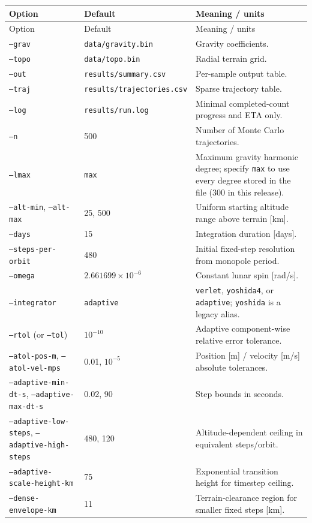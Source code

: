 \documentclass[11pt,a4paper]{article}
\newcommand{\opt}[1]{\texttt{#1}}
\newcommand{\pathcode}[1]{\nolinkurl{#1}}
\begin{document}
{\footnotesize\renewcommand{\arraystretch}{1.11}
\begin{longtable}{@{}p{.32\linewidth}p{.22\linewidth}p{.40\linewidth}@{}}
\toprule Option & Default & Meaning / units\\ \midrule\endfirsthead
\toprule Option & Default & Meaning / units\\ \midrule\endhead
\opt{--grav} & \pathcode{data/gravity.bin} & Gravity coefficients.\\
\opt{--topo} & \pathcode{data/topo.bin} & Radial terrain grid.\\
\opt{--out} & \pathcode{results/summary.csv} & Per-sample output table.\\
\opt{--traj} & \pathcode{results/trajectories.csv} & Sparse trajectory table.\\
\opt{--log} & \pathcode{results/run.log} & Minimal completed-count progress and ETA only.\\
\opt{--n} & 500 & Number of Monte Carlo trajectories.\\
\opt{--lmax} & \opt{max} & Maximum gravity harmonic degree; specify \opt{max} to use every degree stored in the file (300 in this release).\\
\opt{--alt-min}, \opt{--alt-max} & 25, 500 & Uniform starting altitude range above terrain [km].\\
\opt{--days} & 15 & Integration duration [days].\\
\opt{--steps-per-orbit} & 480 & Initial fixed-step resolution from monopole period.\\
\opt{--omega} & \(2.661699\times10^{-6}\) & Constant lunar spin [rad/s].\\
\opt{--integrator} & \opt{adaptive} & \opt{verlet}, \opt{yoshida4}, or \opt{adaptive}; \opt{yoshida} is a legacy alias.\\
\opt{--rtol} (or \opt{--tol}) & \(10^{-10}\) & Adaptive component-wise relative error tolerance.\\
\opt{--atol-pos-m}, \opt{--atol-vel-mps} & 0.01, \(10^{-5}\) & Position [m] / velocity [m/s] absolute tolerances.\\
\opt{--adaptive-min-dt-s}, \opt{--adaptive-max-dt-s} & 0.02, 90 & Step bounds in seconds.\\
\opt{--adaptive-low-steps}, \opt{--adaptive-high-steps} & 480, 120 & Altitude-dependent ceiling in equivalent steps/orbit.\\
\opt{--adaptive-scale-height-km} & 75 & Exponential transition height for timestep ceiling.\\
\opt{--dense-envelope-km} & 11 & Terrain-clearance region for smaller fixed steps [km].\\

\end{longtable}}
\end{document}
